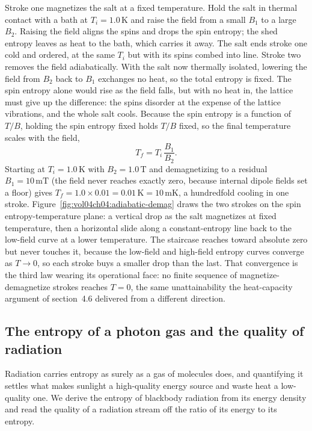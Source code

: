 Stroke one magnetizes the salt at a fixed temperature. Hold the salt in thermal
contact with a bath at $T_i = 1.0\,\si{\kelvin}$ and raise the field from a small
$B_1$ to a large $B_2$. Raising the field aligns the spins and drops the spin
entropy; the shed entropy leaves as heat to the bath, which carries it away. The
salt ends stroke one cold and ordered, at the same $T_i$ but with its spins
combed into line. Stroke two removes the field adiabatically. With the salt now
thermally isolated, lowering the field from $B_2$ back to $B_1$ exchanges no heat,
so the total entropy is fixed. The spin entropy alone would rise as the field
falls, but with no heat in, the lattice must give up the difference: the spins
disorder at the expense of the lattice vibrations, and the whole salt cools.
Because the spin entropy is a function of $T/B$, holding the spin entropy fixed
holds $T/B$ fixed, so the final temperature scales with the field,
\[
T_f = T_i\,\frac{B_1}{B_2}.
\]
Starting at $T_i = 1.0\,\si{\kelvin}$ with $B_2 = 1.0\,\text{T}$ and demagnetizing
to a residual $B_1 = 10\,\text{mT}$ (the field never reaches exactly zero, because
internal dipole fields set a floor) gives $T_f = 1.0\times 0.01 = 0.01\,
\si{\kelvin} = 10\,\text{mK}$, a hundredfold cooling in one stroke.
Figure~\ref{fig:vol04ch04:adiabatic-demag} draws the two strokes on the spin
entropy-temperature plane: a vertical drop as the salt magnetizes at fixed
temperature, then a horizontal slide along a constant-entropy line back to the
low-field curve at a lower temperature. The staircase reaches toward absolute zero
but never touches it, because the low-field and high-field entropy curves converge
as $T \to 0$, so each stroke buys a smaller drop than the last. That convergence
is the third law wearing its operational face: no finite sequence of
magnetize-demagnetize strokes reaches $T = 0$, the same unattainability the
heat-capacity argument of section~4.6 delivered from a different direction.



\subsection{The entropy of a photon gas and the quality of radiation}

Radiation carries entropy as surely as a gas of molecules does, and quantifying
it settles what makes sunlight a high-quality energy source and waste heat a
low-quality one. We derive the entropy of blackbody radiation from its energy
density and read the quality of a radiation stream off the ratio of its energy to
its entropy.

